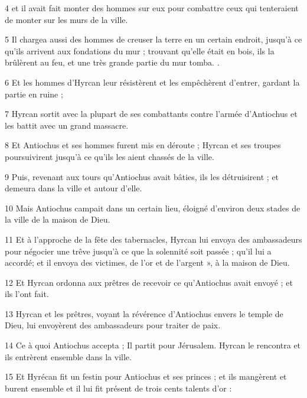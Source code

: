 \par 4 et il avait fait monter des hommes sur eux pour combattre ceux qui tenteraient de monter sur les murs de la ville.

\par 5 Il chargea aussi des hommes de creuser la terre en un certain endroit, jusqu'à ce qu'ils arrivent aux fondations du mur ; trouvant qu'elle était en bois, ils la brûlèrent au feu, et une très grande partie du mur tomba. .

\par 6 Et les hommes d'Hyrcan leur résistèrent et les empêchèrent d'entrer, gardant la partie en ruine ;

\par 7 Hyrcan sortit avec la plupart de ses combattants contre l'armée d'Antiochus et les battit avec un grand massacre.

\par 8 Et Antiochus et ses hommes furent mis en déroute ; Hyrcan et ses troupes poursuivirent jusqu'à ce qu'ils les aient chassés de la ville.

\par 9 Puis, revenant aux tours qu'Antiochus avait bâties, ils les détruisirent ; et demeura dans la ville et autour d'elle.

\par 10 Mais Antiochus campait dans un certain lieu, éloigné d'environ deux stades de la ville de la maison de Dieu.

\par 11 Et à l'approche de la fête des tabernacles, Hyrcan lui envoya des ambassadeurs pour négocier une trêve jusqu'à ce que la solennité soit passée ; qu'il lui a accordé; et il envoya des victimes, de l'or et de l'argent », à la maison de Dieu.

\par 12 Et Hyrcan ordonna aux prêtres de recevoir ce qu'Antiochus avait envoyé ; et ils l'ont fait.

\par 13 Hyrcan et les prêtres, voyant la révérence d'Antiochus envers le temple de Dieu, lui envoyèrent des ambassadeurs pour traiter de paix.

\par 14 Ce à quoi Antiochus accepta ; Il partit pour Jérusalem. Hyrcan le rencontra et ils entrèrent ensemble dans la ville.

\par 15 Et Hyrécan fit un festin pour Antiochus et ses princes ; et ils mangèrent et burent ensemble et il lui fit présent de trois cents talents d'or :

